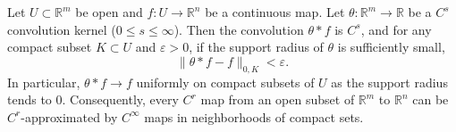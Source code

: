 Let $U \subset \mathbb{R}^m$ be open and $f: U \to \mathbb{R}^n$ be a continuous map. Let $\theta: \mathbb{R}^m \to \mathbb{R}$ be a $C^s$ convolution kernel ($0 \leqslant s \leqslant \infty$). Then the convolution $\theta * f$ is $C^s$, and for any compact subset $K \subset U$ and $\varepsilon > 0$, if the support radius of $\theta$ is sufficiently small,
$$
\|\theta * f - f\|_{0, K} < \varepsilon.
$$
In particular, $\theta * f \to f$ uniformly on compact subsets of $U$ as the support radius tends to $0$. Consequently, every $C^r$ map from an open subset of $\mathbb{R}^m$ to $\mathbb{R}^n$ can be $C^r$-approximated by $C^\infty$ maps in neighborhoods of compact sets.
